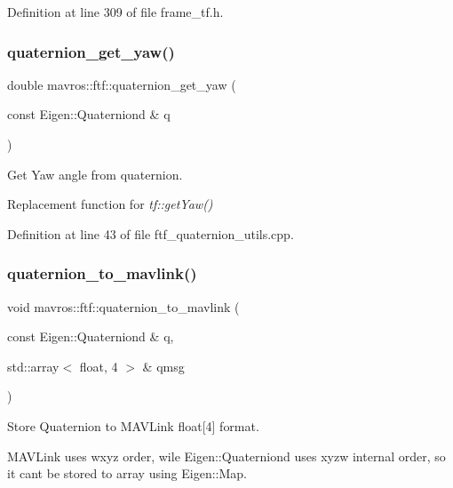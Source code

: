 Definition at line 309 of file frame\+\_\+tf.\+h.

\mbox{\label{group__nodelib_ga6649411f7b10eb37f33afb1d3d67dfea}} 
\subsubsection{\texorpdfstring{quaternion\_get\_yaw()}{quaternion\_get\_yaw()}}
{\footnotesize\ttfamily double mavros\+::ftf\+::quaternion\+\_\+get\+\_\+yaw (\begin{DoxyParamCaption}\item[{const Eigen\+::\+Quaterniond \&}]{q }\end{DoxyParamCaption})}



Get Yaw angle from quaternion. 

Replacement function for {\itshape tf\+::get\+Yaw()} 

Definition at line 43 of file ftf\+\_\+quaternion\+\_\+utils.\+cpp.

\mbox{\label{group__nodelib_gac76089b997c4e184d99bec74603a35ad}} 
\subsubsection{\texorpdfstring{quaternion\_to\_mavlink()}{quaternion\_to\_mavlink()}}
{\footnotesize\ttfamily void mavros\+::ftf\+::quaternion\+\_\+to\+\_\+mavlink (\begin{DoxyParamCaption}\item[{const Eigen\+::\+Quaterniond \&}]{q,  }\item[{std\+::array$<$ float, 4 $>$ \&}]{qmsg }\end{DoxyParamCaption})\hspace{0.3cm}{\ttfamily [inline]}}



Store Quaternion to M\+A\+V\+Link float\mbox{[}4\mbox{]} format. 

M\+A\+V\+Link uses wxyz order, wile Eigen\+::\+Quaterniond uses xyzw internal order, so it can\textquotesingle{}t be stored to array using Eigen\+::\+Map. 

